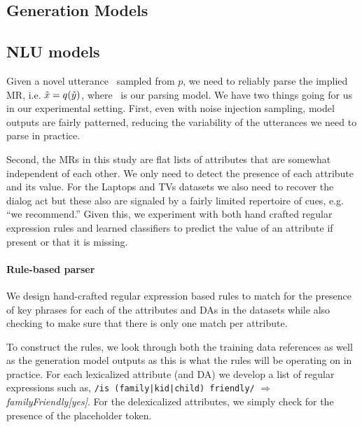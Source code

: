 \subsection{Generation Models}

\subsection{NLU models}
Given a novel utterance \sampley~sampled from $p$, we need to 
reliably parse the implied MR, i.e. $\tilde{x} = q(\tilde{y})$, 
where \clf~is our parsing model. We have two things going for us in 
our experimental setting. First, even with noise injection sampling,
model outputs are fairly patterned, reducing the variability of the utterances
we need to parse in practice. 

Second, the MRs in this study are
flat lists of attributes that are somewhat independent of each other.
We only need to detect the presence of each attribute and its value.
For the Laptops and TVs datasets we also need to recover the dialog
act but these also are signaled by a fairly limited repertoire 
of cues, e.g. ``we recommend.'' %
Given this, we experiment with both hand crafted regular expression 
rules and learned classifiers to predict the value of
an attribute if present or that it is missing. 


\paragraph{Rule-based parser } We design hand-crafted 
regular expression based rules to match for the presence of key phrases 
for each of the attributes and DAs in the datasets while also checking to
make sure that there is only one match per attribute.

To construct the rules, we look through both the training data references as 
well as the generation model outputs as this is what the rules will
be operating on in practice. For each lexicalized attribute (and DA) we 
develop a list of regular expressions %
such as,
\texttt{/is (family|kid|child) friendly/} $\Rightarrow$ \textit{familyFriendly[yes]}.
For the delexicalized attributes, we simply check for the presence 
of the placeholder token. 


